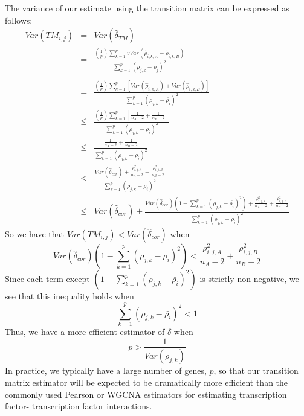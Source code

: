 \documentclass[9pt,twocolumn,twoside]{pnas-new}
\begin{document}
\begin{widetext}
The variance of our estimate using the transition matrix can be expressed
as follows:
\begin{eqnarray*}
Var\left(TM_{i,j}\right) & = & Var\left(\hat{\delta}_{TM}\right)\\
 & = & \frac{\left(\frac{1}{p}\right)\sum_{k=1}^{p}vVar\left(\hat{\rho}_{i,k,A}-\hat{\rho}_{i,k,B}\right)}{\sum_{k=1}^{p}\left(\rho_{j,k}-\bar{\rho_{j}}\right)^{2}}\\
\\
 & = & \frac{\left(\frac{1}{p}\right)\sum_{k=1}^{p}\left[Var\left(\hat{\rho}_{i,k,A}\right)+Var\left(\hat{\rho}_{i,k,B}\right)\right]}{\sum_{k=1}^{p}\left(\rho_{j,k}-\bar{\rho_{i}}\right)^{2}}\\
 & \le & \frac{\left(\frac{1}{p}\right)\sum_{k=1}^{p}\left[\frac{1}{n_{A}-2}+\frac{1}{n_{B}-2}\right]}{\sum_{k=1}^{p}\left(\rho_{j,k}-\bar{\rho_{i}}\right)^{2}}\\
 & \le & \frac{\frac{1}{n_{A}-2}+\frac{1}{n_{B}-2}}{\sum_{k=1}^{p}\left(\rho_{j,k}-\bar{\rho_{i}}\right)^{2}}\\
 & \le & \frac{Var\left(\hat{\delta}_{cor}\right)+\frac{\rho_{i,j,A}^{2}}{n_{A}-2}+\frac{\rho_{i,j,B}^{2}}{n_{B}-2}}{\sum_{k=1}^{p}\left(\rho_{j,k}-\bar{\rho_{i}}\right)^{2}}\\
 & \le & Var\left(\hat{\delta}_{cor}\right)+\frac{Var\left(\hat{\delta}_{cor}\right)\left(1-\sum_{k=1}^{p}\left(\rho_{j,k}-\bar{\rho_{i}}\right)^{2}\right)+\frac{\rho_{i,j,A}^{2}}{n_{A}-2}+\frac{\rho_{i,j,B}^{2}}{n_{B}-2}}{\sum_{k=1}^{p}\left(\rho_{j,k}-\bar{\rho_{i}}\right)^{2}}
\end{eqnarray*}
So we have that $Var\left(TM_{i,j}\right)<Var\left(\hat{\delta}_{cor}\right)$
when
\[
Var\left(\hat{\delta}_{cor}\right)\left(1-\sum_{k=1}^{p}\left(\rho_{j,k}-\bar{\rho_{i}}\right)^{2}\right)<\frac{\rho_{i,j,A}^{2}}{n_{A}-2}+\frac{\rho_{i,j,B}^{2}}{n_{B}-2}
\]
Since each term except $\left(1-\sum_{k=1}^{p}\left(\rho_{j,k}-\bar{\rho_{i}}\right)^{2}\right)$
is strictly non-negative, we see that this inequality holds when 
\[
\sum_{k=1}^{p}\left(\rho_{j,k}-\bar{\rho_{i}}\right)^{2}<1
\]
Thus, we have a more efficient estimator of $\delta$ when 
\[
p>\frac{1}{Var\left(\rho_{j,k}\right)}
\]
In practice, we typically have a large number of genes, $p$, so that
our transition matrix estimator will be expected to be dramatically
more efficient than the commonly used Pearson or WGCNA estimators
for estimating transcription factor- transcription factor interactions.
\end{widetext}
\end{document}
